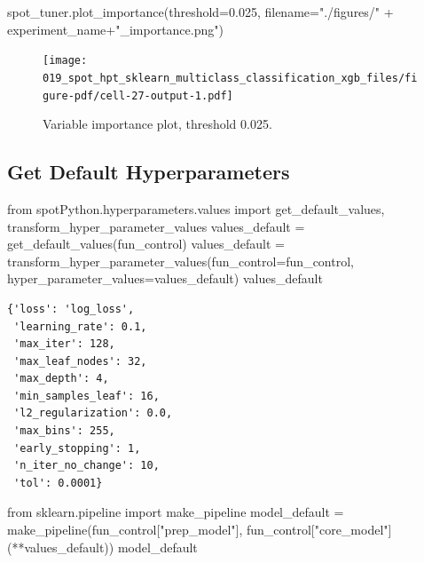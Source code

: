 \documentclass[
  letterpaper,
  DIV=11,
  numbers=noendperiod]{scrreprt}
\newenvironment{Shaded}{\begin{snugshade}}{\end{snugshade}}
\newcommand{\FloatTok}[1]{\textcolor[rgb]{0.68,0.00,0.00}{#1}}
\newcommand{\ImportTok}[1]{\textcolor[rgb]{0.00,0.46,0.62}{#1}}
\newcommand{\NormalTok}[1]{\textcolor[rgb]{0.00,0.23,0.31}{#1}}
\newcommand{\OperatorTok}[1]{\textcolor[rgb]{0.37,0.37,0.37}{#1}}
\newcommand{\StringTok}[1]{\textcolor[rgb]{0.13,0.47,0.30}{#1}}
\begin{document}
\begin{Shaded}
\begin{Highlighting}[]
\NormalTok{spot\_tuner.plot\_importance(threshold}\OperatorTok{=}\FloatTok{0.025}\NormalTok{, filename}\OperatorTok{=}\StringTok{"./figures/"} \OperatorTok{+}\NormalTok{ experiment\_name}\OperatorTok{+}\StringTok{"\_importance.png"}\NormalTok{)}
\end{Highlighting}
\end{Shaded}

\begin{figure}[H]

{\centering \texttt{[image: 019\_spot\_hpt\_sklearn\_multiclass\_classification\_xgb\_files/figure-pdf/cell-27-output-1.pdf]}

}

\caption{Variable importance plot, threshold 0.025.}

\end{figure}

\hypertarget{get-default-hyperparameters-2}{%
\subsection{Get Default
Hyperparameters}\label{get-default-hyperparameters-2}}

\begin{Shaded}
\begin{Highlighting}[]
\ImportTok{from}\NormalTok{ spotPython.hyperparameters.values }\ImportTok{import}\NormalTok{ get\_default\_values, transform\_hyper\_parameter\_values}
\NormalTok{values\_default }\OperatorTok{=}\NormalTok{ get\_default\_values(fun\_control)}
\NormalTok{values\_default }\OperatorTok{=}\NormalTok{ transform\_hyper\_parameter\_values(fun\_control}\OperatorTok{=}\NormalTok{fun\_control, hyper\_parameter\_values}\OperatorTok{=}\NormalTok{values\_default)}
\NormalTok{values\_default}
\end{Highlighting}
\end{Shaded}

\begin{verbatim}
{'loss': 'log_loss',
 'learning_rate': 0.1,
 'max_iter': 128,
 'max_leaf_nodes': 32,
 'max_depth': 4,
 'min_samples_leaf': 16,
 'l2_regularization': 0.0,
 'max_bins': 255,
 'early_stopping': 1,
 'n_iter_no_change': 10,
 'tol': 0.0001}
\end{verbatim}

\begin{Shaded}
\begin{Highlighting}[]
\ImportTok{from}\NormalTok{ sklearn.pipeline }\ImportTok{import}\NormalTok{ make\_pipeline}
\NormalTok{model\_default }\OperatorTok{=}\NormalTok{ make\_pipeline(fun\_control[}\StringTok{"prep\_model"}\NormalTok{], fun\_control[}\StringTok{"core\_model"}\NormalTok{](}\OperatorTok{**}\NormalTok{values\_default))}
\NormalTok{model\_default}
\end{Highlighting}
\end{Shaded}
\end{document}
